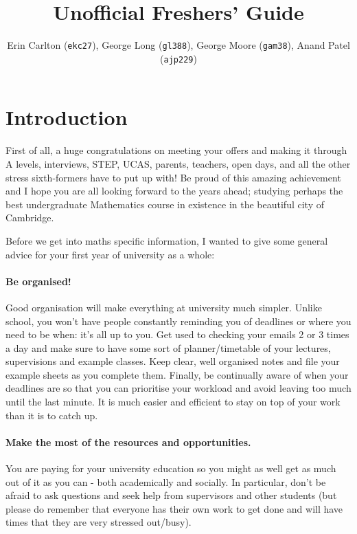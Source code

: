 \documentclass[a4paper,11pt]{article}
\title{Unofficial Freshers' Guide}
\author{Erin Carlton (\texttt{ekc27}), George Long (\texttt{gl388}), 
    George Moore (\texttt{gam38}), Anand Patel (\texttt{ajp229})}
\date{}
\begin{document}
\maketitle

\section{Introduction}

First of all, a huge congratulations on meeting your offers and making it through A levels, interviews, STEP, UCAS, parents, teachers, open days, and all the other stress sixth-formers have to put up with! Be proud of this amazing achievement and I hope you are all looking forward to the years ahead; studying perhaps the best undergraduate Mathematics course in existence in the beautiful city of Cambridge.

Before we get into maths specific information, I wanted to give some general advice for your first year of university as a whole:

\paragraph{Be organised!} Good organisation will make everything at university much simpler. Unlike school, you won't have people constantly reminding you of deadlines or where you need to be when: it's all up to you. Get used to checking your emails 2 or 3 times a day and make sure to have some sort of planner/timetable of your lectures, supervisions and example classes.  Keep clear, well organised notes and file your example sheets as you complete them. Finally, be continually aware of when your deadlines are so that you can prioritise your workload and avoid leaving too much until the last minute. It is much easier and efficient to stay on top of your work than it is to catch up.
 
\paragraph{Make the most of the resources and opportunities.} You are paying for your university education so you might as well get as much out of it as you can - both academically and socially. In particular, don't be afraid to ask questions and seek help from supervisors and other students (but please do remember that everyone has their own work to get done and will have times that they are very stressed out/busy). 
\end{document}
